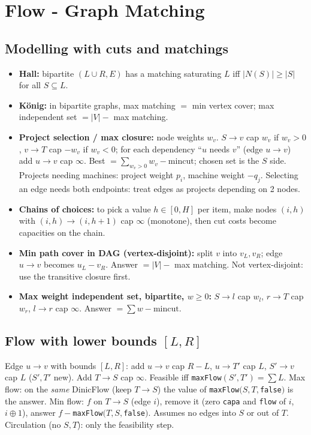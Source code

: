 \chapter{Flow - Graph Matching}

\section{Modelling with cuts and matchings}
\begin{itemize}[leftmargin=*,noitemsep]
	\item \textbf{Hall:} bipartite $(L\cup R,E)$ has a matching
	saturating $L$ iff $|N(S)|\ge|S|$ for all $S\subseteq L$.
	\item \textbf{K\"onig:} in bipartite graphs, max matching $=$ min
	vertex cover; max independent set $= |V| -$ max matching.
	\item \textbf{Project selection / max closure:} node weights $w_v$.
	$S\to v$ cap $w_v$ if $w_v>0$, $v\to T$ cap $-w_v$ if $w_v<0$; for
	each dependency ``$u$ needs $v$'' (edge $u\to v$) add $u\to v$ cap
	$\infty$. Best $=\sum_{w_v>0}w_v-\text{mincut}$; chosen set is the
	$S$ side. Projects needing machines: project weight $p_i$, machine
	weight $-q_j$. Selecting an edge needs both endpoints: treat edges
	as projects depending on 2 nodes.
	\item \textbf{Chains of choices:} to pick a value $h\in[0,H]$ per
	item, make nodes $(i,h)$ with $(i,h)\to(i,h+1)$ cap $\infty$
	(monotone), then cut costs become capacities on the chain.
	\item \textbf{Min path cover in DAG (vertex-disjoint):} split $v$
	into $v_L,v_R$; edge $u\to v$ becomes $u_L - v_R$. Answer $=
	|V| - $ max matching. Not vertex-disjoint: use the transitive
	closure first.
	\item \textbf{Max weight independent set, bipartite, $w\ge0$:}
	$S\to l$ cap $w_l$, $r\to T$ cap $w_r$, $l\to r$ cap $\infty$.
	Answer $=\sum w-\text{mincut}$.
\end{itemize}

\section{Flow with lower bounds $[L,R]$}
Edge $u\to v$ with bounds $[L,R]$: add $u\to v$ cap $R-L$,
$u\to T'$ cap $L$, $S'\to v$ cap $L$ ($S',T'$ new). Add $T\to S$
cap $\infty$. Feasible iff \texttt{maxFlow}$(S',T')=\sum L$. Max
flow: on the \emph{same} DinicFlow (keep $T\to S$) the value of
\texttt{maxFlow}$(S,T,$\texttt{false}$)$ is the answer. Min flow:
$f$ on $T\to S$ (edge $i$), remove it (zero \texttt{capa} and
\texttt{flow} of $i$, $i\oplus1$), answer
$f-$\texttt{maxFlow}$(T,S,$\texttt{false}$)$.
Assumes no edges into $S$ or out of $T$. Circulation (no
$S,T$): only the feasibility step.

